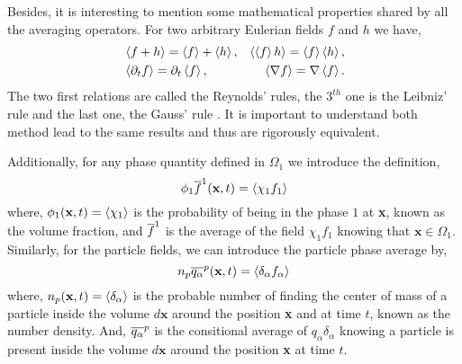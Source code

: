 Besides, it is interesting to mention some mathematical properties shared by all the averaging operators. 
For two arbitrary Eulerian fields $f$ and $h$ we have,
\begin{align}
    &\left<f+h\right> = \left<f\right>+\left<h\right>, 
    &\left<\left<f\right>h\right> = \left<f\right>\left<h\right>, \nonumber \\
    &\left<\partial_t f\right> 
    = \partial_t\left<f\right>, 
    &\left<\mathbf{\nabla} f\right>
    = \mathbf{\nabla} \left<f\right>. 
    \label{eq:avg_properties}
\end{align}
The two first relations are called the Reynolds' rules, the $3^{th}$ one is the Leibniz' 
rule and the last one, the Gauss' rule \citep{drew1983mathematical}.
It is important to understand both method lead to the same results and thus are rigorously equivalent. 


Additionally, for any phase quantity defined in $\Omega_1$ we introduce the definition, 
\begin{equation}
    \phi_1\overline{f}^1(\textbf{x},t) = \left<\chi_1 f_1\right>
    \label{eq:1_avg}
\end{equation}
where, $\phi_1(\textbf{x},t) = \left<\chi_1\right>$ is the probability of being in the phase $1$ at \textbf{x}, known as the volume fraction, and 
$\overline{f}^1$ is the average of the field $\chi_1 f_1$ knowing that $\textbf{x}\in \Omega_1$. 
Similarly, for the particle fields, we can introduce the particle phase average by,
\begin{equation}
     n_p\overline{q_\alpha}^{p}(\textbf{x},t) = \left<\delta_\alpha f_\alpha\right>
     \label{eq:p_avg}
\end{equation}
where, $n_p(\textbf{x},t) = \left<\delta_\alpha\right>$ is the probable number of finding the center of mass of a particle inside the volume $d\textbf{x}$ around the position \textbf{x} and  at time $t$, known as the number density. 
And, $\overline{q_\alpha}^{p}$ is the consitional average of $q_\alpha\delta_\alpha$ knowing a particle is present inside the volume $d\textbf{x}$ around the position \textbf{x} at time $t$. 


